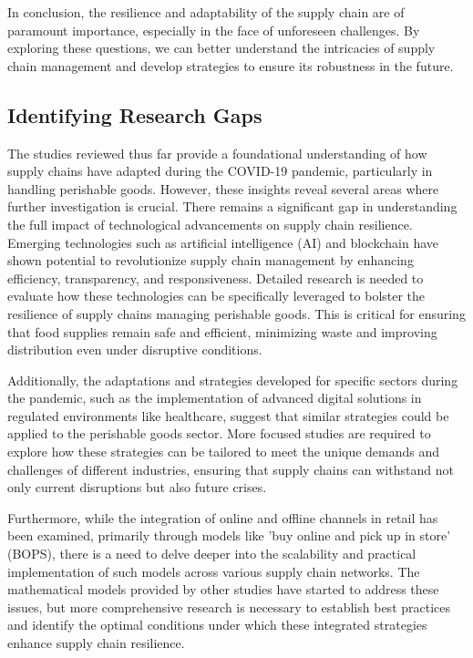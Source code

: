 In conclusion, the resilience and adaptability of the supply chain are of paramount importance, especially in the face of unforeseen challenges. By exploring these questions, we can better understand the intricacies of supply chain management and develop strategies to ensure its robustness in the future.

\subsection{Identifying Research Gaps}

The studies reviewed thus far provide a foundational understanding of how supply chains have adapted during the COVID-19 pandemic, particularly in handling perishable goods. However, these insights reveal several areas where further investigation is crucial. There remains a significant gap in understanding the full impact of technological advancements on supply chain resilience. Emerging technologies such as artificial intelligence (AI) and blockchain have shown potential to revolutionize supply chain management by enhancing efficiency, transparency, and responsiveness. Detailed research is needed to evaluate how these technologies can be specifically leveraged to bolster the resilience of supply chains managing perishable goods. This is critical for ensuring that food supplies remain safe and efficient, minimizing waste and improving distribution even under disruptive conditions. 

Additionally, the adaptations and strategies developed for specific sectors during the pandemic, such as the implementation of advanced digital solutions in regulated environments like healthcare, suggest that similar strategies could be applied to the perishable goods sector. More focused studies are required to explore how these strategies can be tailored to meet the unique demands and challenges of different industries, ensuring that supply chains can withstand not only current disruptions but also future crises.

Furthermore, while the integration of online and offline channels in retail has been examined, primarily through models like 'buy online and pick up in store' (BOPS), there is a need to delve deeper into the scalability and practical implementation of such models across various supply chain networks. The mathematical models provided by other studies have started to address these issues, but more comprehensive research is necessary to establish best practices and identify the optimal conditions under which these integrated strategies enhance supply chain resilience. 

